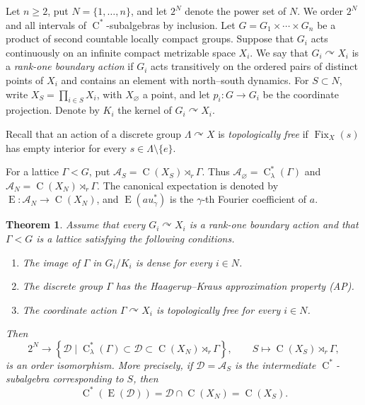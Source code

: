 \documentclass[11pt]{amsart}
\numberwithin{equation}{section}
\newcommand{\rC}{\operatorname{C}}
\newcommand{\rE}{\operatorname{E}}
\newcommand{\Fix}{\operatorname{Fix}}
\newtheorem{maintheorem}{Theorem}
\theoremstyle{definition}
\begin{document}
	Let \(n\geq2\), put \(N=\{1,\ldots,n\}\), and let \(2^N\) denote the power set
	of \(N\). We order \(2^N\) and all intervals of \(\rC^*\)-subalgebras by inclusion.
	Let
	\(G=G_1\times\cdots\times G_n\) be a product of second countable locally
	compact groups. Suppose that \(G_i\) acts continuously on an infinite compact
	metrizable space \(X_i\). We say that \(G_i\curvearrowright X_i\) is a
	\emph{rank-one boundary action} if \(G_i\) acts transitively on the ordered pairs
	of distinct points of \(X_i\) and contains an element with north--south
	dynamics. For \(S\subset N\), write \(X_S=\prod_{i\in S}X_i\), with
	\(X_\varnothing\) a point, and let \(p_i:G\to G_i\) be the coordinate
	projection. Denote by \(K_i\) the kernel of \(G_i\curvearrowright X_i\).

	Recall that an action of a discrete group \(\Lambda\curvearrowright X\) is
	\emph{topologically free} if \(\Fix_X(s)\) has empty interior for every
	\(s\in\Lambda\setminus\{e\}\).
	
	For a lattice \(\Gamma<G\), put
	\(\mathcal A_S=\rC(X_S)\rtimes_r\Gamma\). Thus
	\(\mathcal A_\varnothing=\rC^*_{\lambda}(\Gamma)\) and
	\(\mathcal A_N=\rC(X_N)\rtimes_r\Gamma\). The canonical expectation is denoted
	by \(\rE:\mathcal A_N\to\rC(X_N)\), and \(\rE(au_\gamma^*)\) is the
	\(\gamma\)-th Fourier coefficient of \(a\).
	
	\begin{maintheorem}\label{thm:classification}
		Assume that every \(G_i\curvearrowright X_i\) is a rank-one boundary action and that \(\Gamma<G\) is a lattice satisfying the following conditions.
		\begin{enumerate}[\rm (i)]
			\item The image of \(\Gamma\) in \(G_i/K_i\) is dense for every \(i\in N\).
			\item The discrete group \(\Gamma\) has the Haagerup--Kraus approximation property {\rm(AP)}.
			\item The coordinate action \(\Gamma\curvearrowright X_i\) is topologically free for every \(i\in N\).
		\end{enumerate}
		Then
		\[
		2^N\longrightarrow
		\left\{\mathcal D\mid
		\rC^*_{\lambda}(\Gamma)\subset\mathcal D\subset
		\rC(X_N)\rtimes_r\Gamma\right\},
		\qquad
		S\longmapsto\rC(X_S)\rtimes_r\Gamma,
		\]
		is an order isomorphism. More precisely, if \(\mathcal D=\mathcal A_S\) is the intermediate \(\rC^*\)-subalgebra corresponding to \(S\), then
		\[
		\rC^*(\rE(\mathcal D))
		=\mathcal D\cap\rC(X_N)
		=\rC(X_S).
		\]
	\end{maintheorem}
\end{document}
